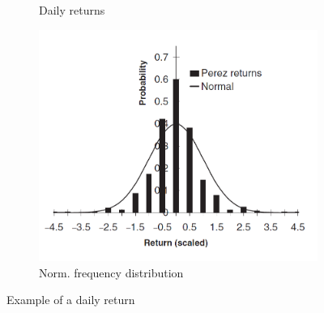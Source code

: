 \begin{figure}[H]
\begin{subfigure}[b]{0.3\textwidth}
        \caption{Daily returns}
    \end{subfigure}
    \begin{subfigure}[b]{0.3\textwidth}
        \includegraphics[width=\textwidth]{figure/daily_return_3.png}
        \caption{Norm. frequency distribution}
    \end{subfigure}
    \caption{Example of a daily return}
    \label{fig:daily_return}
\end{figure}



